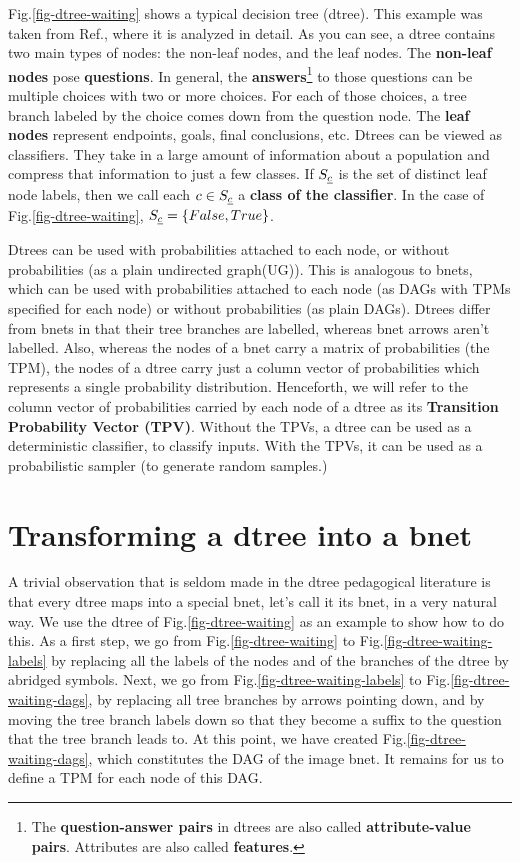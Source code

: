 Fig.\ref{fig-dtree-waiting}
shows a typical decision tree (dtree).
This example was taken
from Ref.\cite{stu-nor-book},
where it is analyzed
in detail.
As you can see,
a dtree contains two main types
of nodes: the non-leaf nodes,
and the leaf nodes.
The {\bf non-leaf nodes} pose
{\bf questions}. In general,
the {\bf answers}\footnote
{The {\bf question-answer pairs}
in dtrees are
also called
{\bf attribute-value pairs}.
Attributes are also
called {\bf features}.}
 to those
questions can
be multiple choices with
two or more choices.
For each of those choices,
a tree branch labeled by the choice
 comes down from the 
question node.
The {\bf leaf nodes} represent
endpoints, goals, final
conclusions, etc.
Dtrees can be viewed
as classifiers. They
take in a large amount 
of information about a population 
and compress that information
to just a few classes.
If $S_\rvc$ is the 
set of distinct leaf node labels,
then we call each
$c\in S_\rvc$
a  {\bf class of the classifier}.
In the case of
Fig.\ref{fig-dtree-waiting},
$S_\rvc=\{False, True\}$.

Dtrees can be used 
with
probabilities attached to each node, or without
probabilities
(as a
plain undirected graph(UG)).
This is analogous to bnets,
which can be used with
probabilities attached to each node
 (as DAGs with
TPMs specified for each node) or without
probabilities (as plain
DAGs).
Dtrees differ 
from bnets in that
their tree branches 
are labelled, whereas bnet arrows
 aren't labelled.
Also,
whereas the nodes of
a bnet carry a matrix of 
probabilities (the TPM),
the nodes of a dtree carry
just a column vector
of probabilities
which represents
a single 
probability distribution.
Henceforth,
we will refer to
the column vector
of probabilities
carried by each node of a dtree
as its {\bf Transition
Probability Vector (TPV)}.
Without the TPVs,
a dtree can be used 
as a deterministic classifier,
to classify inputs.
With the TPVs,
it can be used as a 
probabilistic sampler (to generate
random samples.)

\section{Transforming a dtree into a bnet}
A trivial 
observation
that is seldom made
in the dtree pedagogical literature
is that every dtree 
maps into a special bnet, 
let's call it
its  bnet,
in a very natural way.
We use the dtree
of Fig.\ref{fig-dtree-waiting}
as an example to show 
how to do this. As 
a first 
step,
we go from
Fig.\ref{fig-dtree-waiting}
to
Fig.\ref{fig-dtree-waiting-labels}
by
replacing
all the labels of the
nodes and of the branches of
the dtree 
by abridged symbols. 
Next, we go 
from Fig.\ref{fig-dtree-waiting-labels}
to Fig.\ref{fig-dtree-waiting-dags},
by replacing all tree branches 
by arrows pointing down,
 and by
moving the tree branch labels 
down so that they
become a suffix to the question 
that the tree branch leads to.
At this point,
we have created
Fig.\ref{fig-dtree-waiting-dags},
which constitutes
the DAG of the image bnet.
It remains for us to define
a TPM for each node
of this DAG.

